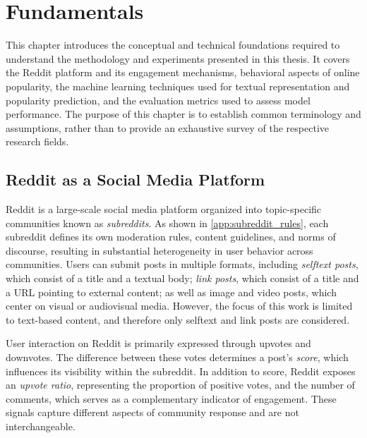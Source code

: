 \chapter{Fundamentals}
\label{chap:basics}
This chapter introduces the conceptual and technical foundations required to understand the methodology and experiments presented in this thesis. It covers the Reddit platform and its engagement mechanisms, behavioral aspects of online popularity, the machine learning techniques used for textual representation and popularity prediction, and the evaluation metrics used to assess model performance. The purpose of this chapter is to establish common terminology and assumptions, rather than to provide an exhaustive survey of the respective research fields.

\section{Reddit as a Social Media Platform}

Reddit is a large-scale social media platform organized into topic-specific communities known as \emph{subreddits}. As shown in \autoref{app:subreddit_rules}, each subreddit defines its own moderation rules, content guidelines, and norms of discourse, resulting in substantial heterogeneity in user behavior across communities. Users can submit posts in multiple formats, including \emph{selftext posts}, which consist of a title and a textual body; \emph{link posts}, which consist of a title and a URL pointing to external content; as well as image and video posts, which center on visual or audiovisual media. However, the focus of this work is limited to text-based content, and therefore only selftext and link posts are considered.

User interaction on Reddit is primarily expressed through upvotes and downvotes. The difference between these votes determines a post’s \emph{score}, which influences its visibility within the subreddit. In addition to score, Reddit exposes an \emph{upvote ratio}, representing the proportion of positive votes, and the number of comments, which serves as a complementary indicator of engagement. These signals capture different aspects of community response and are not interchangeable.


